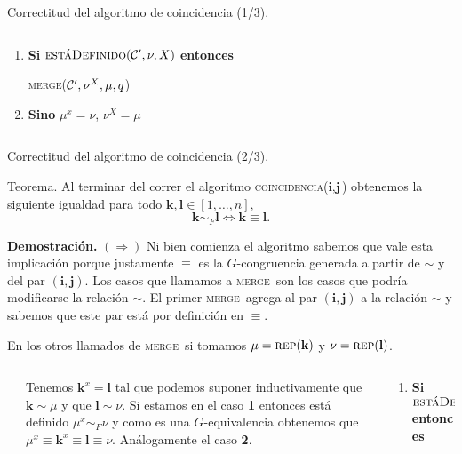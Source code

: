 \documentclass[aspectratio=169, 9pt]{beamer}
\newcommand{\rep}{\textsc{rep}}
\newcommand{\coin}{\textsc{coincidencia}}
\newcommand{\mer}{\textsc{merge}}
\newcommand{\edeff}{\textsc{estáDefinido}}
\newcommand{\Co}{{\cal{C}}}
\begin{document}
\begin{frame}[fragile]{Correctitud del algoritmo de coincidencia (1/3).}
\begin{columns}
\begin{column}{0.5\textwidth}
\begin{enumerate}
				 \mer($\Co', \mu^x, \nu, q$) 
				\item  \textbf{Si} $\edeff(\Co', \nu, X)$  \textbf{entonces}
				
				  \mer($\Co', \nu^X, \mu, q$)
				\item \textbf{Sino} $\mu^x = \nu$, $\nu^X = \mu$ 
			\end{enumerate}
		\end{column}
	\end{columns}
\end{frame}


\begin{frame}[fragile]{Correctitud del algoritmo de coincidencia (2/3).}
	\begin{alertblock}{Teorema.}
		Al terminar del correr el algoritmo \coin($\textbf{i}, \textbf{j}$) obtenemos la siguiente igualdad para todo $\textbf{k}, \textbf{l} \in [1,\dots,n]$,
		\begin{equation*}
			\textbf{k} \sim_F \textbf{l} \iff \textbf{k} \equiv \textbf{l}.
		\end{equation*}
	\end{alertblock}
	\pause 
	
	\textbf{Demostración.} $(\Rightarrow)$
	\pause
	Ni bien comienza el algoritmo sabemos que vale esta implicación porque justamente $\equiv$ es la $G$-congruencia generada a partir de $\sim$ y del par $(\textbf{i}, \textbf{j})$.
	\pause
	Los casos que llamamos a \mer \ son los casos que podría modificarse la relación $\sim$.
	El primer \mer \ agrega al par $(\textbf{i}, \textbf{j})$ a la relación $\sim$ y sabemos que este par está por definición en $\equiv$.
	\pause
	
	
	En los otros llamados de \mer \ si tomamos $\mu = \rep(\textbf{k}) $ y $\nu = \rep(\textbf{l})$.
	\medskip
	\pause
	\begin{columns}
		\begin{column}{0.1\textwidth}
			
		\end{column}
		\begin{column}{0.6\textwidth}
			\begin{center}
				{ Tenemos $\textbf{k}^x = \textbf{l}$ tal que podemos suponer inductivamente que $\textbf{k} \sim \mu$ y que $\textbf{l} \sim \nu $.
				Si estamos en el caso \textbf{1} entonces está definido $\mu^x \sim_F \nu$ y como es una $G$-equivalencia obtenemos que $\mu^x \equiv \textbf{k}^x \equiv \textbf{l} \equiv \nu$. 
				Análogamente el caso \textbf{2}.}
			\end{center} 	
		\end{column}
		\begin{column}{0.3\textwidth}
			{\small \begin{enumerate}
				\item  \textbf{Si} $\edeff(\Co', \mu, x)$ \textbf{entonces}
				

\end{enumerate}}
\end{column}
\end{columns}
\end{frame}
\end{document}
